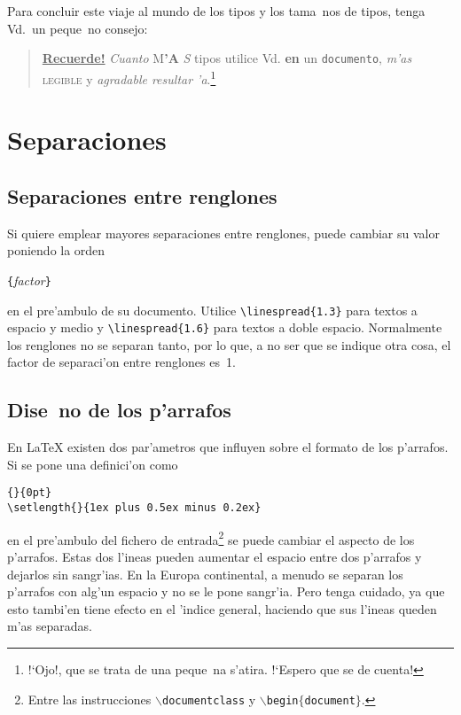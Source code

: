 Para concluir este viaje al mundo de los tipos y los tama~nos de
tipos, tenga Vd.\ un peque~no consejo:
\nopagebreak
\begin{quote}
  \underline{\textbf{Recuerde\Huge!}} \textit{Cuanto}
  \textsf{M\textbf{\LARGE 'A} \textsl{S}} tipos \Huge utilice \tiny
  Vd. \footnotesize \textbf{en} un \small \texttt{documento}\Huge,
  \large \textit{m'as} \normalsize \textsc{legible} y
  \textsl{\textsf{agradable} resul\large t\Large a\LARGE r\huge
    'a}.\footnote{!`Ojo!, que se trata de una peque~na s'atira.
    !`Espero que se de cuenta!}
\end{quote}

\section{Separaciones}
 
\subsection{Separaciones entre renglones}

 Si quiere emplear mayores
separaciones entre renglones, puede cambiar su valor poniendo la orden
\begin{command}
\verb|{|\emph{factor}\verb|}|
\end{command}
\noindent en el pre'ambulo de su documento. Utilice
\verb|\linespread{1.3}| para textos a espacio y medio y
\verb|\linespread{1.6}| para textos a doble espacio. Normalmente los
renglones no se separan tanto, por lo que, a no ser que se indique
otra cosa, el factor de separaci'on entre renglones es~1.%
 
\subsection{Dise~no de los p'arrafos}\label{parsp}

En \LaTeX{} existen dos par'ametros que influyen sobre el formato de
los p'arrafos. Si se pone una definici'on como
\begin{code}
\verb|{|\verb|}{0pt}| \\
\verb|\setlength{|\verb|}{1ex plus 0.5ex minus 0.2ex}|
\end{code}
en el pre'ambulo del fichero de entrada\footnote{Entre las
  instrucciones $\backslash$\texttt{documentclass} y
  $\backslash$\texttt{begin$\mathtt{\{}$document$\mathtt{\}}$}.} se
puede cambiar el aspecto de los p'arrafos. Estas dos l'ineas pueden
aumentar el espacio entre dos p'arrafos y dejarlos sin sangr'ias. En
la Europa continental, a menudo se separan los p'arrafos con alg'un
espacio y no se le pone sangr'ia. Pero tenga cuidado, ya que esto
tambi'en tiene efecto en el 'indice general, haciendo que sus l'ineas
queden m'as separadas.

